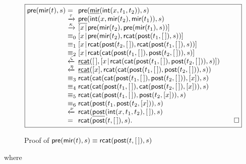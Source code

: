 \begin{figure}
\begin{equation*}
\boxed{
\begin{array}{@{}r@{\;}l@{\;}l@{\qquad}r@{}}
\fun{pre}(\fun{mir}(t),s)
& = & \fun{pre}(\ufun{mir}(\fun{int}(x,t_1,t_2)),s)\\
& \xrightarrow{\smash{\tau}}
& \ufun{pre}(\fun{int}(x,\fun{mir}(t_2),\fun{mir}(t_1)),s)\\
& \xrightarrow{\smash{\kappa}}
& \cons{x}{\fun{pre}(\fun{mir}(t_2),\fun{pre}(\fun{mir}(t_1),s))}\\
& \equiv_0
& \cons{x}{\fun{pre}(\fun{mir}(t_2),
           \fun{rcat}(\fun{post}(t_1,\el),s))}\\
& \equiv_1
& \cons{x}{\fun{rcat}(\fun{post}(t_2,\el),
           \fun{rcat}(\fun{post}(t_1,\el),s))}\\
& \equiv_2
& \cons{x}{\fun{rcat}(\fun{cat}(\fun{post}(t_1,\el), \fun{post}(t_2,\el)), s)}\\
& \xleftarrow{\smash{\zeta}}
& \ufun{rcat}(\el,\cons{x}{\fun{rcat}(\fun{cat}(\fun{post}(t_1,\el),
                                       \fun{post}(t_2,\el)), s)})\\
& \xleftarrow{\smash{\eta}}
& \ufun{rcat}([x],\fun{rcat}(\fun{cat}(\fun{post}(t_1,\el), \fun{post}(t_2,\el)), s))\\
& \equiv_3
& \fun{rcat}(\fun{cat}(\fun{cat}(\fun{post}(t_1,\el), \fun{post}(t_2,\el)), [x]), s)\\
& \equiv_4
& \fun{rcat}(\fun{cat}(\fun{post}(t_1,\el),
                       \fun{cat}(\fun{post}(t_2,\el),
                                 [x])),
             s)\\
& \equiv_5
& \fun{rcat}(\fun{cat}(\fun{post}(t_1,\el),
                       \fun{post}(t_2,[x])),
             s)\\
& \equiv_6
& \fun{rcat}(\fun{post}(t_1,\fun{post}(t_2,[x])),s)\\
& \xleftarrow{\smash{\nu}}
& \fun{rcat}(\ufun{post}(\fun{int}(x,t_1,t_2),\el),s)\\
& =
& \fun{rcat}(\fun{post}(t,\el),s).
& \hfill\Box
\end{array}
}
\end{equation*}
\caption{Proof of \(\textsf{pre}(\textsf{mir}(t),s) \equiv
  \textsf{rcat}(\textsf{post}(t,[\,]),s)\)}
\label{fig:premir}
\end{figure}
where
